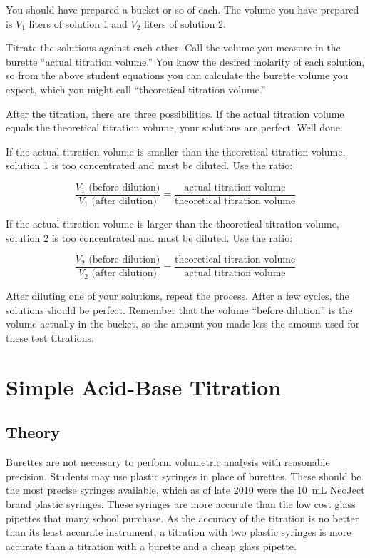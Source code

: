 You should have prepared a bucket or so of each. The volume you have prepared is $ V_{1} $ liters of solution 1 and $ V_{2} $ liters of solution 2.

Titrate the solutions against each other. Call the volume you measure in the burette ``actual titration volume.''  You know the desired molarity of each solution, so from the above student equations you can calculate the burette volume you expect, which you might call ``theoretical titration volume.''

After the titration, there are three possibilities. If the actual titration volume equals the theoretical titration volume, your solutions are perfect. Well done.

If the actual titration volume is smaller than the theoretical titration volume, solution 1 is too concentrated and must be diluted. Use the ratio:

\[ \frac{V_{1} \mbox{ (before dilution)}}{V_{1} \mbox{ (after dilution)}} = \frac{\mbox{actual titration volume}}{\mbox{theoretical titration volume}} \]

If the actual titration volume is larger than the theoretical titration volume, solution 2 is too concentrated and must be diluted. Use the ratio:

\[ \frac{V_{2} \mbox{ (before dilution)}}{V_{2} \mbox{ (after dilution)}} = \frac{\mbox{theoretical titration volume}}{\mbox{actual titration volume}} \]

After diluting one of your solutions, repeat the process. After a few cycles, the solutions should be perfect. Remember that the volume ``before dilution'' is the volume actually in the bucket, so the amount you made less the amount used for these test titrations.

\section{Simple Acid-Base Titration}

\subsection{Theory}

Burettes are not necessary to perform volumetric analysis with reasonable precision. Students may use plastic syringes in place of burettes. These should be the most precise syringes available, which as of late 2010 were the 10~mL NeoJect brand plastic syringes. These syringes are more accurate than the low cost glass pipettes that many school purchase. As the accuracy of the titration is no better than its least accurate instrument, a titration with two plastic syringes is more accurate than a titration with a burette and a cheap glass pipette.

